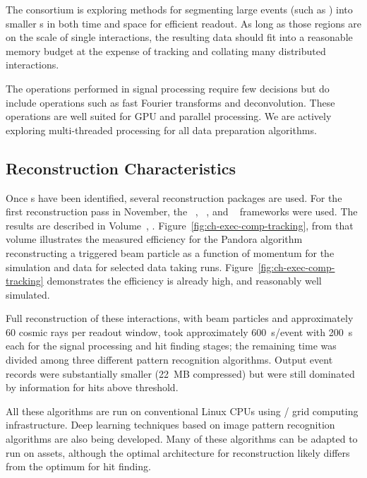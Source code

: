 The  consortium is exploring methods for segmenting large events (such as ) into  smaller s in both time and space for efficient readout.  As long as those regions are on the scale of single interactions, the resulting data should fit into a reasonable memory budget at the expense of tracking and collating many distributed interactions. 

The operations performed in signal processing require few decisions but do include operations such as fast Fourier transforms and deconvolution.  These operations are well suited for GPU and parallel processing. We are actively exploring multi-threaded processing for all data preparation algorithms. 


\subsection{Reconstruction Characteristics}

Once s have been identified, several \threed  reconstruction packages are used. For the first reconstruction pass in November, the  ~\cite{Acciarri:2017hat}, ~\cite{wirecell}, and ~\cite{ref:PMA}  frameworks were used. The results are described in Volume~\volnumberphysics{}, \voltitlephysics{}. 
Figure~\ref{fig:ch-exec-comp-tracking}, from that volume illustrates the measured efficiency for the Pandora algorithm reconstructing a triggered beam particle as a function of momentum for the simulation and data for selected data taking runs. Figure~\ref{fig:ch-exec-comp-tracking} demonstrates the efficiency is already high, and reasonably well simulated.

Full reconstruction of these  interactions, with beam particles and approximately 60 cosmic rays per readout window, took  approximately \SI{600}{s/event} with \SI{200}{s} each for the signal processing and hit finding stages; the remaining time was divided among three different pattern recognition algorithms. Output event records were substantially smaller (\SI{22}{MB} compressed) but were still dominated by information for  hits above threshold. 

All these algorithms are run on conventional %
Linux CPUs using / grid computing  infrastructure. Deep learning techniques based on image pattern recognition algorithms are also being developed. Many of these algorithms can be adapted to run on  assets, although the optimal architecture for \threed reconstruction likely differs from the optimum for hit finding.

